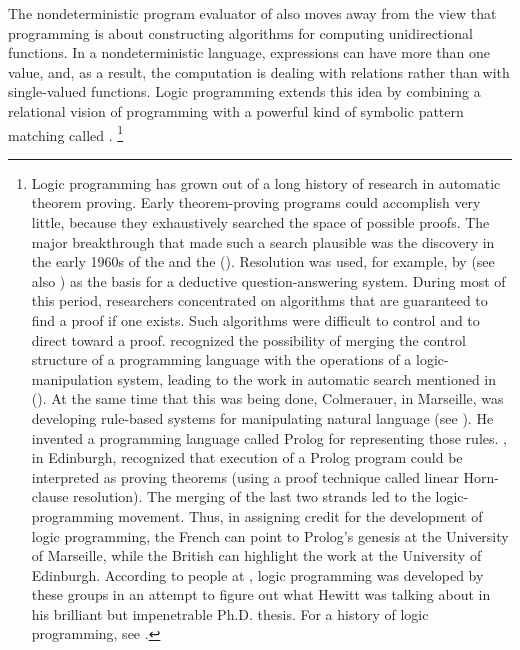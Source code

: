 The nondeterministic program evaluator of  also moves away from the view that programming is about constructing algorithms for computing unidirectional functions.
In a nondeterministic language, expressions can have more than one value, and, as a result, the computation is dealing with relations rather than with single-valued functions.
Logic programming extends this idea by combining a relational vision of programming with a powerful kind of symbolic pattern matching called .%
\footnote{
	Logic programming has grown out of a long history of research in automatic theorem proving.
	Early theorem-proving programs could accomplish very little, because they exhaustively searched the space of possible proofs.
	The major breakthrough that made such a search plausible was the discovery in the early 1960s of the  and the  ().
	Resolution was used, for example, by  (see also ) as the basis for a deductive question-answering system.
	During most of this period, researchers concentrated on algorithms that are guaranteed to find a proof if one exists.
	Such algorithms were difficult to control and to direct toward a proof.
	 recognized the possibility of merging the control structure of a programming language with the operations of a logic-manipulation system, leading to the work in automatic search mentioned in  ().
	At the same time that this was being done, Colmerauer, in Marseille, was developing rule-based systems for manipulating natural language (see \autocite{colmerauer_et_al_system_communication_homme-machine}).
	He invented a programming language called Prolog for representing those rules.
	, in Edinburgh, recognized that execution of a Prolog program could be interpreted as proving theorems (using a proof technique called linear Horn-clause resolution).
	The merging of the last two strands led to the logic-programming movement.
	Thus, in assigning credit for the development of logic programming, the French can point to Prolog’s genesis at the University of Marseille, while the British can highlight the work at the University of Edinburgh.
	According to people at , logic programming was developed by these groups in an attempt to figure out what Hewitt was talking about in his brilliant but impenetrable Ph.D. thesis.
	For a history of logic programming, see .
}

